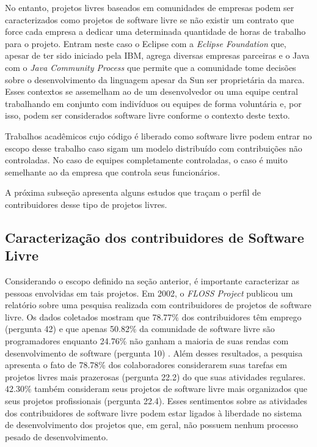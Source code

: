 No entanto, projetos livres baseados em comunidades de empresas podem
ser caracterizados como projetos de software livre se não existir um
contrato que force cada empresa a dedicar uma determinada quantidade
de horas de trabalho para o projeto. Entram neste caso o Eclipse com a
\emph{Eclipse Foundation} que, apesar de ter sido iniciado pela IBM,
agrega diversas empresas parceiras e o Java com o \emph{Java Community
  Process} que permite que a comunidade tome decisões sobre o
desenvolvimento da linguagem apesar da Sun ser proprietária da
marca. Esses contextos se assemelham ao de um desenvolvedor ou uma
equipe central trabalhando em conjunto com indivíduos ou equipes de
forma voluntária e, por isso, podem ser considerados software livre
conforme o contexto deste texto.

Trabalhos acadêmicos cujo código é liberado como software livre podem
entrar no escopo desse trabalho caso sigam um modelo distribuído com
contribuições não controladas. No caso de equipes completamente
controladas, o caso é muito semelhante ao da empresa que controla seus
funcionários.

A próxima subseção apresenta alguns estudos que traçam o perfil de
contribuidores desse tipo de projetos livres.

\subsection{Caracterização dos contribuidores de Software Livre}
\label{subsec:caracterizacao}

Considerando o escopo definido na seção anterior, é importante
caracterizar as pessoas envolvidas em tais projetos. Em 2002, o
\emph{FLOSS Project} \cite{FlossProject} publicou um relatório sobre
uma pesquisa realizada com contribuidores de projetos de software
livre. Os dados coletados mostram que 78.77\% dos contribuidores têm
emprego (pergunta 42) e que apenas 50.82\% da comunidade de software
livre são programadores enquanto 24.76\% não ganham a maioria de suas
rendas com desenvolvimento de software (pergunta 10)
\cite{FlossStats}. Além desses resultados, a pesquisa apresenta o fato
de 78.78\% dos colaboradores considerarem suas tarefas em projetos
livres mais prazerosas (pergunta 22.2) do que suas atividades
regulares. 42.30\% também consideram seus projetos de software livre
mais organizados que seus projetos profissionais (pergunta 22.4).
Esses sentimentos sobre as atividades dos contribuidores de software
livre podem estar ligados à liberdade no sistema de desenvolvimento
dos projetos que, em geral, não possuem nenhum processo pesado de
desenvolvimento.

